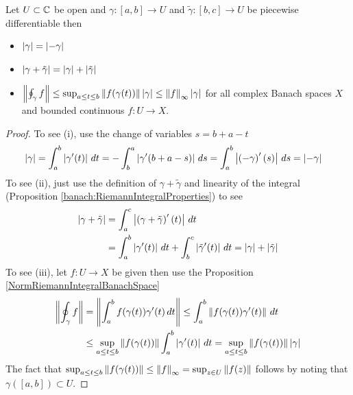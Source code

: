 \begin{prop}\label{banach:ArclengthProperties}Let $U \subset \mathbb{C}$ be open and $\gamma : [a,b] \to U$ and $\tilde{\gamma} : [b,c] \to U$ be piecewise differentiable then
  \begin{itemize}
  \item[(i)] $\left \vert \gamma \right \vert = \left \vert -\gamma \right \vert$
  \item[(ii)] $\left \vert \gamma + \tilde{\gamma} \right \vert = \left \vert \gamma \right \vert + \left \vert \tilde{\gamma} \right \vert$
  \item[(iii)] $\left \lVert \oint_{\gamma} f \right \rVert \leq \sup_{a \leq t \leq b} \left \lVert f(\gamma(t)) \right \rVert \left \vert \gamma \right \vert \leq \left \lVert f \right \rVert_\infty \left \vert \gamma \right \vert$ for all complex Banach spaces $X$ and bounded continuous $f : U \to X$.
  \end{itemize}
\end{prop}
\begin{proof}
  To see (i), use the change of variables $s = b+a-t$
  \begin{align*}
    \left \vert \gamma \right \vert &= \int_a^b \left \vert \gamma^\prime(t) \right \vert \, dt = -\int_b^a \left \vert \gamma^\prime(b + a - s) \right \vert \, ds = \int_a^b \left \vert \left(-\gamma\right)^\prime(s) \right \vert \, ds  = \left \vert -\gamma \right \vert
  \end{align*}
  To see (ii), just use the definition of $\gamma + \tilde{\gamma}$ and linearity of the integral (Proposition \ref{banach:RiemannIntegralProperties}) to see
  \begin{align*}
    \left \vert \gamma + \tilde{\gamma} \right \vert &= \int_a^c \left \vert \left(\gamma + \tilde{\gamma}\right)^\prime(t) \right \vert \, dt \\
    &= \int_a^b \left \vert \gamma^\prime(t) \right \vert \, dt + \int_b^c \left \vert \tilde{\gamma}^\prime(t) \right \vert \, dt = \left \vert \gamma \right \vert + \left \vert \tilde{\gamma} \right \vert
  \end{align*}
  To see (iii), let $f : U \to X$ be given then use the Proposition \ref{NormRiemannIntegralBanachSpace}
  \begin{align*}
    \left \lVert \oint_\gamma f \right \rVert &= \left \lVert \int_a^b f(\gamma(t)) \gamma^\prime(t) \, dt \right \rVert \leq \int_a^b \left \lVert  f(\gamma(t)) \gamma^\prime(t) \right \rVert  \, dt \\
    &\leq \sup_{a \leq t \leq b} \left \lVert f(\gamma(t)) \right \rVert  \int_a^b \left \vert \gamma^\prime(t) \right \vert \, dt = \sup_{a \leq t \leq b} \left \lVert f(\gamma(t)) \right \rVert  \left \vert \gamma \right \vert
  \end{align*}
  The fact that $\sup_{a \leq t \leq b} \left \lVert f(\gamma(t)) \right \rVert \leq \left \lVert f \right \rVert_\infty = \sup_{z \in U} \left \lVert f(z) \right \rVert$ follows by noting that $\gamma([a,b]) \subset U$.
\end{proof}

